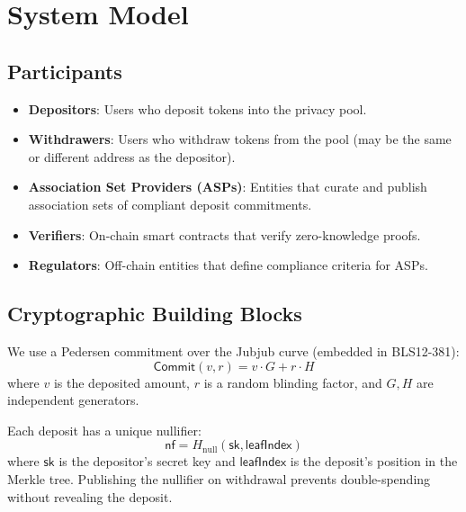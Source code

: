 \section{System Model}
\label{sec:model}

\subsection{Participants}

\begin{definition}
\begin{itemize}
    \item \textbf{Depositors}: Users who deposit tokens into the privacy pool.
    \item \textbf{Withdrawers}: Users who withdraw tokens from the pool (may be the same or different address as the depositor).
    \item \textbf{Association Set Providers (ASPs)}: Entities that curate and publish association sets of compliant deposit commitments.
    \item \textbf{Verifiers}: On-chain smart contracts that verify zero-knowledge proofs.
    \item \textbf{Regulators}: Off-chain entities that define compliance criteria for ASPs.
\end{itemize}
\end{definition}

\subsection{Cryptographic Building Blocks}

\begin{definition}
We use a Pedersen commitment over the Jubjub curve (embedded in BLS12-381):
\begin{equation}
    \mathsf{Commit}(v, r) = v \cdot G + r \cdot H
\end{equation}
where $v$ is the deposited amount, $r$ is a random blinding factor, and $G, H$ are independent generators.
\end{definition}

\begin{definition}[Nullifier]
Each deposit has a unique nullifier:
\begin{equation}
    \mathsf{nf} = H_{\text{null}}(\mathsf{sk}, \mathsf{leafIndex})
\end{equation}
where $\mathsf{sk}$ is the depositor's secret key and $\mathsf{leafIndex}$ is the deposit's position in the Merkle tree. Publishing the nullifier on withdrawal prevents double-spending without revealing the deposit.
\end{definition}

